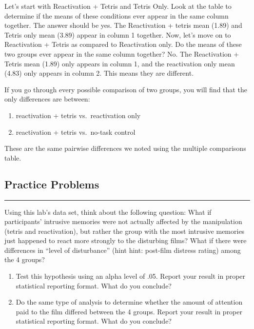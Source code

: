 \documentclass[]{book}
\providecommand{\tightlist}{%
  \setlength{\itemsep}{0pt}\setlength{\parskip}{0pt}}
\begin{document}
Let's start with Reactivation + Tetris and Tetris Only. Look at the
table to determine if the means of these conditions ever appear in the
same column together. The answer should be yes. The Reactivation +
tetris mean (1.89) and Tetris only mean (3.89) appear in column 1
together. Now, let's move on to Reactivation + Tetris as compared to
Reactivation only. Do the means of these two groups ever appear in the
same column together? No. The Reactivation + Tetris mean (1.89) only
appears in column 1, and the reactivation only mean (4.83) only appears
in column 2. This means they are different.

If you go through every possible comparison of two groups, you will find
that the only differences are between:

\begin{enumerate}
\def\labelenumi{\arabic{enumi}.}
\tightlist
\item
  reactivation + tetris vs.~reactivation only
\item
  reactivation + tetris vs.~no-task control
\end{enumerate}

These are the same pairwise differences we noted using the multiple
comparisons table.

\subsection{Practice Problems}\label{practice-problems-8}

\begin{center}\rule{0.5\linewidth}{0.5pt}\end{center}

Using this lab's data set, think about the following question: What if
participants' intrusive memories were not actually affected by the
manipulation (tetris and reactivation), but rather the group with the
most intrusive memories just happened to react more strongly to the
disturbing films? What if there were differences in ``level of
disturbance'' (hint hint: post-film distress rating) among the 4 groups?

\begin{enumerate}
\def\labelenumi{\arabic{enumi}.}
\item
  Test this hypothesis using an alpha level of .05. Report your result
  in proper statistical reporting format. What do you conclude?
\item
  Do the same type of analysis to determine whether the amount of
  attention paid to the film differed between the 4 groups. Report your
  result in proper statistical reporting format. What do you conclude?
\end{enumerate}
\end{document}
